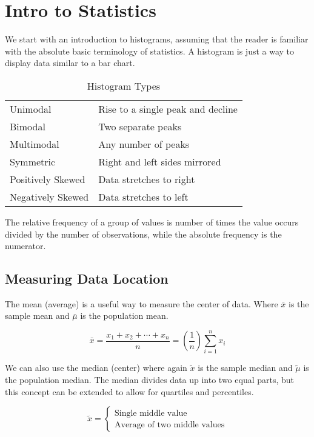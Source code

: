 \section{Intro to Statistics}
We start with an introduction to histograms, assuming that the reader is familiar with the absolute basic terminology of
statistics. A histogram is just a way to display data similar to a bar chart.

\begin{table}[!ht]
    \centering
    \begin{tabular}{|l|l|}
        \hline
        Unimodal & Rise to a single peak and decline\\
        Bimodal & Two separate peaks\\
        Multimodal & Any number of peaks\\
        \hline
        Symmetric & Right and left sides mirrored\\
        Positively Skewed & Data stretches to right\\
        Negatively Skewed & Data stretches to left\\
        \hline
    \end{tabular}
    \caption{Histogram Types}
    \label{table:histograms}
\end{table}

The relative frequency of a group of values is number of times the value occurs divided by the number of observations,
while the absolute frequency is the numerator.

    \subsection{Measuring Data Location}
    The mean (average) is a useful way to measure the center of data. Where $\bar{x}$ is the sample mean and $\bar{\mu}$
    is the population mean.

        \[ \bar{x} = \frac{x_1 + x_2 + \cdots + x_n}{n} = \left( \frac{1}{n} \right) \sum^n_{i=1} x_i \]

    We can also use the median (center) where again $\tilde{x}$ is the sample median and $\tilde{\mu}$ is the population
    median. The median divides data up into two equal parts, but this concept can be extended to allow for quartiles and
    percentiles.

        \[
            \tilde{x} = \begin{cases}
                            \text{Single middle value}\\
                            \text{Average of two middle values}
                        \end{cases}
        \]

